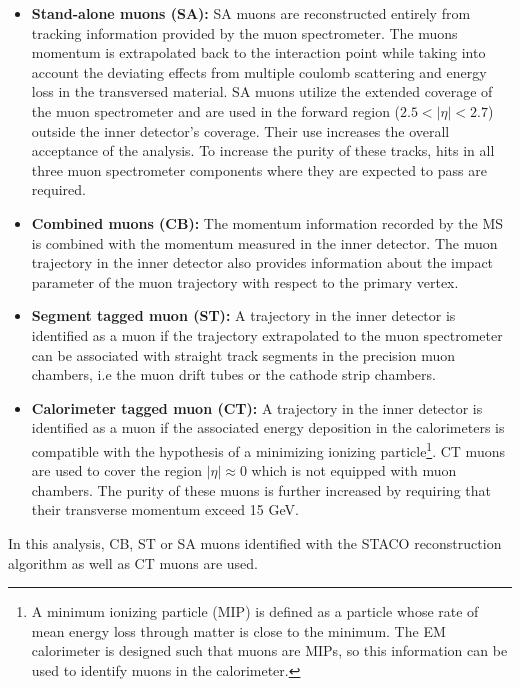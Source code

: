 \begin{itemize}
    \item \textbf{Stand-alone muons (SA):} SA muons are reconstructed entirely from
    tracking information provided by the muon spectrometer. The muons momentum
    is extrapolated back to the interaction point while taking into account the
    deviating effects from multiple coulomb scattering and energy loss in the 
    transversed material. SA muons utilize the extended coverage of the muon 
    spectrometer 
    and are used in the forward region ($2.5 < |\eta| < 2.7$) outside the 
    inner detector's coverage. Their use increases the overall acceptance 
    of the analysis. To increase the purity of these tracks, hits
    in all three muon spectrometer components where they are expected to pass
    are required.

    \item \textbf{Combined muons (CB):} The momentum information recorded by
    the MS is combined with the momentum measured in the inner detector. The
    muon trajectory in the inner detector also provides information about the 
    impact parameter of the muon trajectory with respect to the primary vertex.

    \item \textbf{Segment tagged muon (ST):} A trajectory in the inner detector
    is identified as a muon if the trajectory extrapolated to the muon spectrometer
    can be associated with straight track segments in the precision muon chambers,
    i.e the muon drift tubes or the cathode strip chambers.

    \item \textbf{Calorimeter tagged muon (CT):} A trajectory in the inner detector
    is identified as a muon if the associated energy deposition in the calorimeters
    is compatible with the hypothesis of a minimizing ionizing particle\footnote{
    A minimum ionizing particle (MIP) is defined as a particle whose rate 
    of mean energy loss through matter is close to the minimum. 
    The EM calorimeter is designed such that muons are MIPs, so this information
    can be used to identify muons in the calorimeter.}.
    CT muons are used to cover the region
    $|\eta| \approx 0$ which is not equipped with muon chambers. The purity
    of these muons is further increased by requiring that their
    transverse momentum exceed 15 GeV.
\end{itemize}
In this analysis, CB, ST or SA muons identified with the STACO reconstruction 
algorithm as well as CT muons are used.

